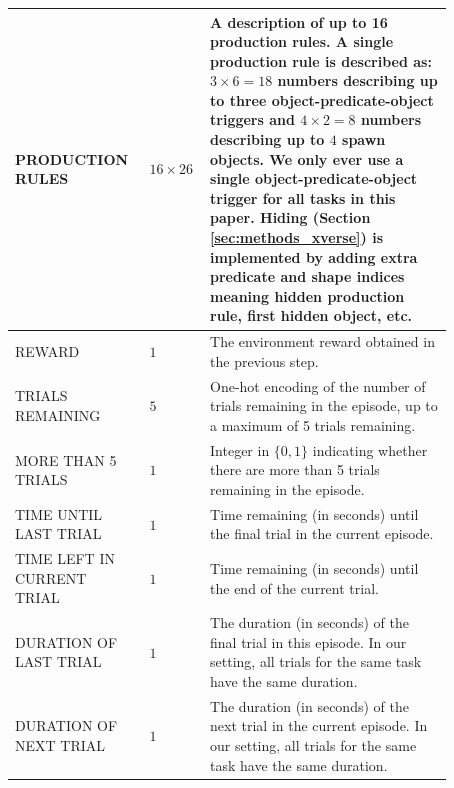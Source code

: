 \begin{longtable}{>{\raggedright}p{0.25\linewidth}|p{0.1\linewidth}|p{0.52\linewidth}}
    \hline
      PRODUCTION RULES & $16 \times 26$ & A description of up to 16 production rules. A single production rule is described as: $3 \times 6 = 18$ numbers describing up to three object-predicate-object triggers and $4 \times 2 = 8$ numbers describing up to $4$ spawn objects. We only ever use a single object-predicate-object trigger for all tasks in this paper. Hiding (Section \ref{sec:methods_xverse}) is implemented by adding extra predicate and shape indices meaning hidden production rule, first hidden object, etc. \\
      \hline
      REWARD &$1$& The environment reward obtained in the previous step.\\
      \hline
      TRIALS REMAINING &$5$& One-hot encoding of the number of trials remaining in the episode, up to a maximum of 5 trials remaining. \\
      \hline
      MORE THAN 5 TRIALS &$1$& Integer in $\{0,1\}$ indicating whether there are more than 5 trials remaining in the episode. \\
      \hline
      TIME UNTIL LAST TRIAL &$1$& Time remaining (in seconds) until the final trial in the current episode. \\
      \hline
      TIME LEFT IN CURRENT TRIAL &$1$& Time remaining (in seconds) until the end of the current trial. \\
      \hline
      DURATION OF LAST TRIAL &$1$& The duration (in seconds) of the final trial in this episode. In our setting, all trials for the same task have the same duration.  \\
      \hline
      DURATION OF NEXT TRIAL &$1$& The duration (in seconds) of the next trial in the current episode. In our setting, all trials for the same task have the same duration. \\
      \hline
\end{longtable}